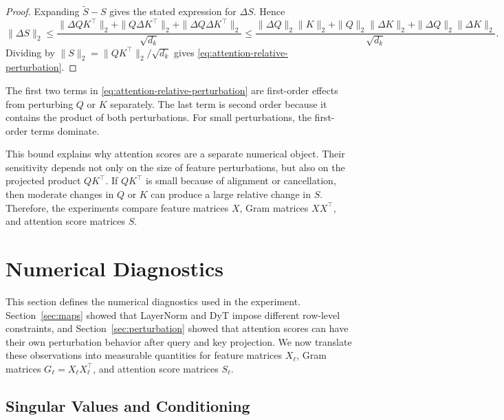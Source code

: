 \documentclass[11pt]{article}
\begin{document}
\begin{proof}
Expanding \(\widetilde S-S\) gives the stated expression for \(\Delta S\). Hence
\[
    \|\Delta S\|_2
    \leq
    \frac{
        \|\Delta QK^\top\|_2+\|Q\Delta K^\top\|_2+\|\Delta Q\Delta K^\top\|_2
    }{\sqrt{d_k}}
    \leq
    \frac{
        \|\Delta Q\|_2\|K\|_2+\|Q\|_2\|\Delta K\|_2+\|\Delta Q\|_2\|\Delta K\|_2
    }{\sqrt{d_k}}.
\]
Dividing by \(\|S\|_2=\|QK^\top\|_2/\sqrt{d_k}\) gives \eqref{eq:attention-relative-perturbation}.
\end{proof}

The first two terms in \eqref{eq:attention-relative-perturbation} are first-order effects from perturbing \(Q\) or \(K\) separately. The last term is second order because it contains the product of both perturbations. For small perturbations, the first-order terms dominate.

This bound explains why attention scores are a separate numerical object. Their sensitivity depends not only on the size of feature perturbations, but also on the projected product \(QK^\top\). If \(QK^\top\) is small because of alignment or cancellation, then moderate changes in \(Q\) or \(K\) can produce a large relative change in \(S\). Therefore, the experiments compare feature matrices \(X\), Gram matrices \(XX^\top\), and attention score matrices \(S\).

\section{Numerical Diagnostics}
\label{sec:diagnostics}

This section defines the numerical diagnostics used in the experiment. Section~\ref{sec:maps} showed that LayerNorm and DyT impose different row-level constraints, and Section~\ref{sec:perturbation} showed that attention scores can have their own perturbation behavior after query and key projection. We now translate these observations into measurable quantities for feature matrices \(X_\ell\), Gram matrices \(G_\ell=X_\ell X_\ell^\top\), and attention score matrices \(S_\ell\).

\subsection{Singular Values and Conditioning}
\end{document}
